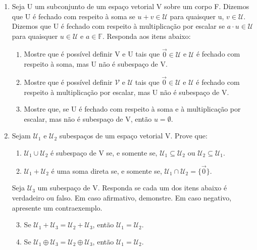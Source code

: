 \documentclass[12pt]{article}
\begin{document}
\begin{enumerate}
    \item Seja U um subconjunto de um espaço vetorial V sobre um corpo F. Dizemos que U é fechado com respeito à soma se $u+v \in \mathcal{U}$ para quaisquer u, $v \in \mathcal{U}$. Dizemos que U é fechado com respeito à multiplicação por escalar se $a \cdot u \in \mathcal{U}$ para quaisquer $u \in \mathcal{U}$ e $a \in \mathbb{F}$. Responda aos itens abaixo:
    \begin{enumerate}
        \item Mostre que é possível definir V e U tais que $\vec{0} \in \mathcal{U}$ e $\mathcal{U}$ é fechado com respeito à soma, mas U não é subespaço de V.
        \item Mostre que é possível definir $\mathcal{V}$ e $\mathcal{U}$ tais que $\vec{0} \in \mathcal{U}$ e $\mathcal{U}$ é fechado com respeito à multiplicação por escalar, mas U não é subespaço de V.
        \item Mostre que, se U é fechado com respeito à soma e à multiplicação por escalar, mas não é subespaço de V, então $u=\emptyset$.
    \end{enumerate}

    \item Sejam $\mathcal{U}_{1}$ e $\mathcal{U}_{2}$ subespaços de um espaço vetorial V. Prove que:
    \begin{enumerate}
        \item $\mathcal{U}_{1} \cup \mathcal{U}_{2}$ é subespaço de V se, e somente se, $\mathcal{U}_{1} \subseteq \mathcal{U}_{2}$ ou $\mathcal{U}_{2} \subseteq \mathcal{U}_{1}$.
        \item $\mathcal{U}_{1} + \mathcal{U}_{2}$ é uma soma direta se, e somente se, $\mathcal{U}_{1} \cap \mathcal{U}_{2} = \{\vec{0}\}$.
    \end{enumerate}
    Seja $\mathcal{U}_{3}$ um subespaço de V. Responda se cada um dos itens abaixo é verdadeiro ou falso. Em caso afirmativo, demonstre. Em caso negativo, apresente um contraexemplo.
    \begin{enumerate}
        \setcounter{enumii}{2}
        \item Se $\mathcal{U}_{1} + \mathcal{U}_{3} = \mathcal{U}_{2} + \mathcal{U}_{3}$, então $\mathcal{U}_{1} = \mathcal{U}_{2}$.
        \item Se $\mathcal{U}_{1} \oplus \mathcal{U}_{3} = \mathcal{U}_{2} \oplus \mathcal{U}_{3}$, então $\mathcal{U}_{1} = \mathcal{U}_{2}$.
    \end{enumerate}


\end{enumerate}
\end{document}
